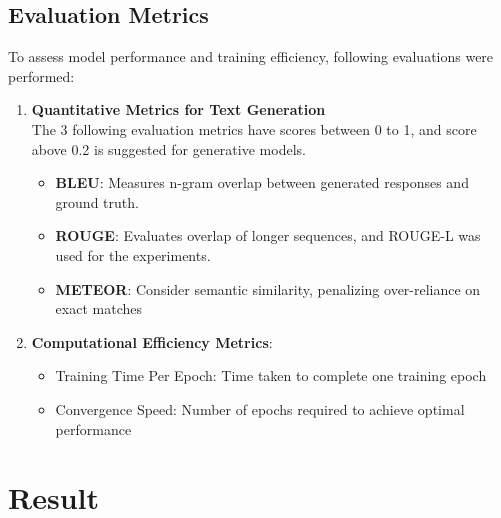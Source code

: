 \documentclass[11pt]{article}
\begin{document}
\subsection{Evaluation Metrics}
To assess model performance and training efficiency, following evaluations were performed:
    \begin{enumerate}
        \item \textbf{Quantitative Metrics for Text Generation}\\   
        The 3 following evaluation metrics have scores between 0 to 1, and score above 0.2 is suggested for generative models.
          \begin{itemize}
            \item \textbf{BLEU}: Measures n-gram overlap between generated responses and ground truth. 
            \item \textbf{ROUGE}: Evaluates overlap of longer sequences, and ROUGE-L was used for the experiments.
            \item \textbf{METEOR}: Consider semantic similarity, penalizing over-reliance on exact matches
        \end{itemize}
        \item \textbf{Computational Efficiency Metrics}:
            \begin{itemize}
                \item Training Time Per Epoch: Time taken to complete one training epoch
                \item Convergence Speed: Number of epochs required to achieve optimal performance
            \end{itemize}
    \end{enumerate}
  

\section{Result}
\end{document}
